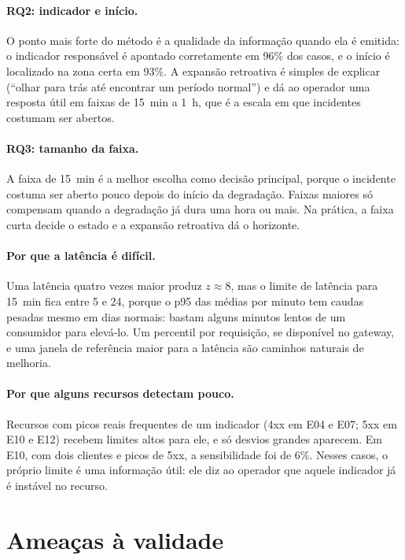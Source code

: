 \documentclass[sigconf,nonacm]{acmart}
\begin{document}
\paragraph{RQ2: indicador e início.} O ponto mais forte do método é a qualidade da informação quando ela é emitida: o indicador responsável é apontado corretamente em 96\% dos casos, e o início é localizado na zona certa em 93\%. A expansão retroativa é simples de explicar (``olhar para trás até encontrar um período normal'') e dá ao operador uma resposta útil em faixas de 15~min a 1~h, que é a escala em que incidentes costumam ser abertos.

\paragraph{RQ3: tamanho da faixa.} A faixa de 15~min é a melhor escolha como decisão principal, porque o incidente costuma ser aberto pouco depois do início da degradação. Faixas maiores só compensam quando a degradação já dura uma hora ou mais. Na prática, a faixa curta decide o estado e a expansão retroativa dá o horizonte.

\paragraph{Por que a latência é difícil.} Uma latência quatro vezes maior produz $z\approx8$, mas o limite de latência para 15~min fica entre 5 e 24, porque o p95 das médias por minuto tem caudas pesadas mesmo em dias normais: bastam alguns minutos lentos de um consumidor para elevá-lo. Um percentil por requisição, se disponível no gateway, e uma janela de referência maior para a latência são caminhos naturais de melhoria.

\paragraph{Por que alguns recursos detectam pouco.} Recursos com picos reais frequentes de um indicador (4xx em E04 e E07; 5xx em E10 e E12) recebem limites altos para ele, e só desvios grandes aparecem. Em E10, com dois clientes e picos de 5xx, a sensibilidade foi de 6\%. Nesses casos, o próprio limite é uma informação útil: ele diz ao operador que aquele indicador já é instável no recurso.

\section{Ameaças à validade}\label{sec:ameacas}
\end{document}
